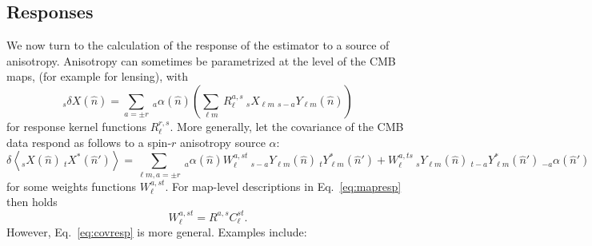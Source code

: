 \documentclass{article}
\newcommand{\Ylm}[1]{\:_{#1}Y_{\ell m}}
\newcommand{\av}[1]{\left\langle #1 \right\rangle}
\newcommand{\hn}[0]{\hat n}
\begin{document}
\subsection{Responses}
We now turn to the calculation of the response of the estimator to a source of anisotropy. Anisotropy can sometimes be parametrized at the level of the CMB maps, (for example for lensing), with
\begin{equation}\label{eq:mapresp}
	_{s}\delta X(\hn) = \sum_{a = \pm r}\:_{a}\alpha(\hn) \left( \sum_{\ell m}\: R_\ell^{a, s} \:_sX_{\ell m} \Ylm {s- a}(\hn)\right)
\end{equation}
for response kernel functions $R^{r,s}_\ell$. More generally, let the covariance of the CMB data respond as follows to a spin-$r$ anisotropy source $\alpha$:
\begin{equation}\label{eq:covresp}
	\delta  \av{_sX(\hn) \:_tX^*(\hn')} =   \sum_{\ell m, a = \pm r}\:_{a}\alpha(\hn) W_\ell^{a, st} \:_{s - a}Y_{\ell m}(\hn)  \:_{t}Y^*_{\ell m}(\hn')  +   W_\ell^{a, ts} \:_{s}Y_{\ell m}(\hn)  \:_{t-a}Y^*_{\ell m}(\hn')\:_{-a}\alpha(\hn')
\end{equation}
for some weights functions $W_\ell^{a, st}$. For map-level descriptions in Eq.~\eqref{eq:mapresp} then holds
\begin{equation}
	W_\ell^{a, st} = R^{a, s} C_\ell^{st}.
\end{equation}
However, Eq.~\eqref{eq:covresp} is more general.
Examples include:
\end{document}
